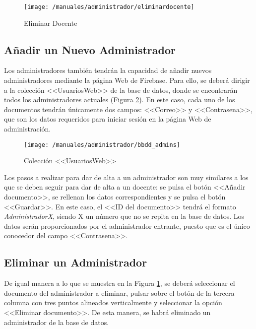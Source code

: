 \begin{figure}[!h]
	\begin{center}
		\texttt{[image: /manuales/administrador/eliminardocente]}
		\caption{Eliminar Docente}
		\label{fig:eliminardocente}
	\end{center}
\end{figure}

\clearpage

\subsection*{Añadir un Nuevo Administrador}
Los administradores también tendrán la capacidad de añadir nuevos administradores mediante la página Web de Firebase. Para ello, se deberá dirigir a la colección <<UsuariosWeb>> de la base de datos, donde se encontrarán todos los administradores actuales (Figura \ref{fig:bbdduweb}). En este caso, cada uno de los documentos tendrán únicamente dos campos: <<Correo>> y <<Contrasena>>, que son los datos requeridos para iniciar sesión en la página Web de administración.

\begin{figure}[!h]
	\begin{center}
		\texttt{[image: /manuales/administrador/bbdd\_admins]}
		\caption{Colección <<UsuariosWeb>>}
		\label{fig:bbdduweb}
	\end{center}
\end{figure}

Los pasos a realizar para dar de alta a un administrador son muy similares a los que se deben seguir para dar de alta a un docente: se pulsa el botón <<Añadir documento>>, se rellenan los datos correspondientes y se pulsa el botón <<Guardar>>. En este caso, el <<ID del documento>> tendrá el formato \mbox{\textit{AdministradorX}}, siendo X un número que no se repita en la base de datos. Los datos serán proporcionados por el administrador entrante, puesto que es el único conocedor del campo <<Contrasena>>.

\subsection*{Eliminar un Administrador}
De igual manera a lo que se muestra en la Figura \ref{fig:eliminardocente}, se deberá seleccionar el documento del administrador a eliminar, pulsar sobre el botón de la tercera columna con tres puntos alineados verticalmente y seleccionar la opción <<Eliminar documento>>. De esta manera, se habrá eliminado un administrador de la base de datos.

